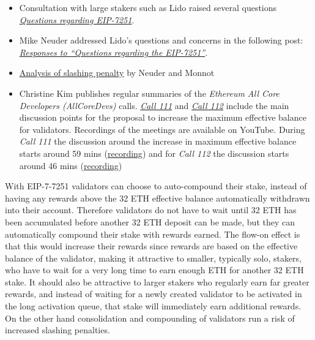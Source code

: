 \documentclass[UTF8]{article}
\begin{document}
\begin{itemize}
\item Consultation with large stakers such as Lido raised several questions \href{https://hackmd.io/wPqtVNjPTYa_tO5HEtq4_g}{\textit{Questions regarding EIP-7251}}.

\item Mike Neuder addressed Lido's questions and concerns in the following post: \href{https://docs.google.com/document/d/17R_OaZSqTG-zbDPdWy2sB280TBPIgMRA-zVEP-N4TQk/edit#heading=h.auj94rdsub84}{\textit{Responses to ``Questions regarding the EIP-7251''}}.

\item \href{https://notes.ethereum.org/@mikeneuder/slashings-eip-7251}{Analysis of slashing penalty} by Neuder and Monnot \cite{Neuder2023d}

\item Christine Kim publishes regular summaries of the \textit{Ethereum All Core Developers (AllCoreDevs)} calls. \href{https://www.galaxy.com/research/insights/ethereum-all-core-developers-consensus-call-111/}{\textit{Call 111}} and \href{https://www.galaxy.com/research/insights/ethereum-all-core-developers-consensus-call-112/}{\textit{Call 112}} include the main discussion points for the proposal to increase the maximum effective balance for validators. Recordings of the meetings are available on YouTube. During \textit{Call 111} the discussion around the increase in maximum effective balance starts around 59 mins (\href{https://youtu.be/ybgQuRcz9sg?t=3569}{recording}) and for \textit{Call 112} the discussion starts around 46 mins (\href{https://youtu.be/zdqtl9x\_UjA?t=2775}{recording})
\end{itemize}

With EIP-7-7251 validators can choose to auto-compound their stake, instead of having any rewards above the 32 ETH effective balance automatically withdrawn into their account. Therefore validators do not have to wait until 32 ETH has been accumulated before another 32 ETH deposit can be made, but they can automatically compound their stake with rewards earned. The flow-on effect is that this would increase their rewards since rewards are based on the effective balance of the validator, making it attractive to smaller, typically solo, stakers, who have to wait for a very long time to earn enough ETH for another 32 ETH stake. It should also be attractive to larger stakers who regularly earn far greater rewards, and instead of waiting for a newly created validator to be activated in the long activation queue, that stake will immediately earn additional rewards. On the other hand consolidation and compounding of validators run a risk of increased slashing penalties.  
\end{document}
